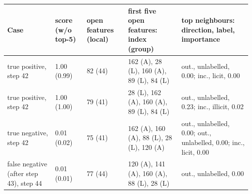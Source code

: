\begin{tabular}{p{2.2cm}p{1.3cm}p{1.5cm}p{3.6cm}p{4.0cm}}
\toprule
Case & score (w/o top-5) & open features (local) & first five open features: index (group) & top neighbours: direction, label, importance\\
\midrule
true positive, step 42 & 1.00 (0.99) & 82 (44) & 162 (A), 28 (L), 160 (A), 89 (L), 84 (L) & out., unlabelled, 0.00; inc., licit, 0.00\\
true positive, step 42 & 1.00 (1.00) & 79 (41) & 28 (L), 162 (A), 160 (A), 89 (L), 84 (L) & out., unlabelled, 0.23; inc., illicit, 0.02\\
true negative, step 42 & 0.01 (0.02) & 75 (41) & 162 (A), 160 (A), 88 (L), 28 (L), 120 (A) & out., unlabelled, 0.00; out., unlabelled, 0.00; inc., licit, 0.00\\
false negative (after step 43), step 44 & 0.01 (0.01) & 77 (44) & 120 (A), 141 (A), 160 (A), 88 (L), 28 (L) & out., unlabelled, 0.00\\
\bottomrule
\end{tabular}
